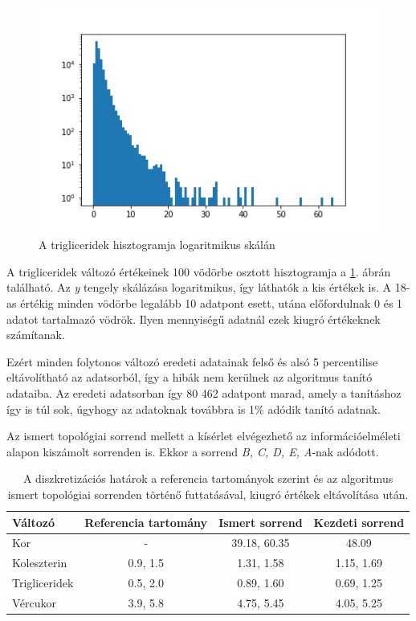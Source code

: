 \begin{figure}[htp]
    \centering
    \includegraphics[width=12cm]{figures/TGL_hist.png}
    \caption{A trigliceridek hisztogramja logaritmikus skálán}
    \label{fig:cardio_tgl_hist}
\end{figure}

A trigliceridek változó értékeinek 100 vödörbe osztott hisztogramja a \ref{fig:cardio_tgl_hist}. ábrán található. Az \emph{y} tengely skálázása logaritmikus, így láthatók a kis értékek is. A 18-as értékig minden vödörbe legalább 10 adatpont esett, utána előfordulnak 0 és 1 adatot tartalmazó vödrök. Ilyen mennyiségű adatnál ezek kiugró értékeknek számítanak.

Ezért minden folytonos változó eredeti adatainak felső és alsó 5 percentilise eltávolítható az adatsorból, így a hibák nem kerülnek az algoritmus tanító adataiba. Az eredeti adatsorban így 80 462 adatpont marad, amely a tanításhoz így is túl sok, úgyhogy az adatoknak továbbra is 1\% adódik tanító adatnak.

Az ismert topológiai sorrend mellett a kísérlet elvégezhető az információelméleti alapon kiszámolt sorrenden is. Ekkor a sorrend \emph{B, C, D, E, A}-nak adódott.

\begin{table}[htp]\centering
\begin{tabular}{lccc}
    Változó       & Referencia tartomány & Ismert sorrend & Kezdeti sorrend \\ \hline
    Kor           & -                    & 39.18, 60.35   & 48.09           \\
    Koleszterin   & 0.9, 1.5             & 1.31, 1.58     & 1.15, 1.69      \\
    Trigliceridek & 0.5, 2.0             & 0.89, 1.60     & 0.69, 1.25      \\
    Vércukor      & 3.9, 5.8             & 4.75, 5.45     & 4.05, 5.25
    \end{tabular}
    \caption{A diszkretizációs határok a referencia tartományok szerint és az algoritmus ismert topológiai sorrenden történő futtatásával, kiugró értékek eltávolítása után.}
    \label{tab:cardio_kiugro_ertek}
\end{table}

